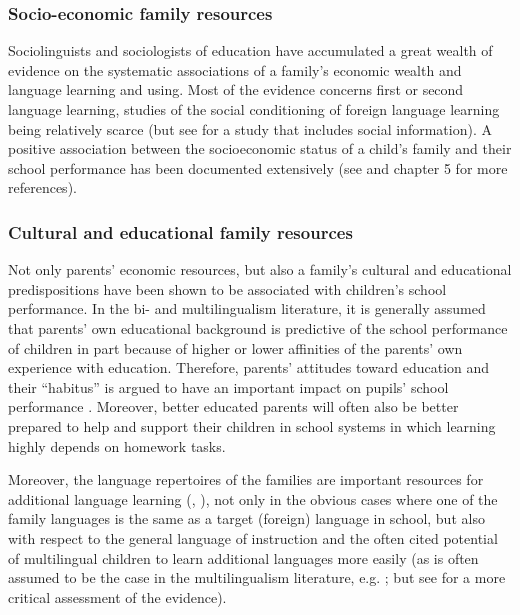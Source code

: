 \documentclass[output=paper]{langscibook}
\begin{document}
\subsubsection{Socio-economic family resources} %

Sociolinguists and sociologists of education have accumulated a great wealth of evidence on the systematic associations of a family’s economic wealth and language learning and using. Most of the evidence concerns first or second language learning, studies of the social conditioning of foreign language learning being relatively scarce (but see \citealt{KliemeDESIKonsortium2008} for a study that includes social information). A positive association between the socioeconomic status of a child’s family and their school performance has been documented extensively  (see \citealt{EntwisleAlexander1992} and chapter 5 for more references).

\subsubsection{Cultural and educational family resources}  %

Not only parents’ economic resources, but also a family’s cultural and educational predispositions have been shown to be associated with children’s school performance. In the bi- and multilingualism literature, it is generally assumed that parents' own educational background is predictive of the school performance of children in part because of higher or lower affinities of the parents' own experience with education. Therefore, parents’ attitudes toward education and their ``habitus'' is argued to have an important impact on pupils’ school performance \citep{Gogolin1994}. Moreover, better educated parents will often also be better prepared to help and support their children in school systems in which learning highly depends on homework tasks. 

Moreover, the language repertoires of the families are important resources for additional language learning (\citealt{SchepensEtAl2016}, \citealt{SchepensEtAl2020}), not only in the obvious cases where one of the family languages is the same as a target (foreign) language in school, but also with respect to the general language of instruction and the often cited potential of multilingual children to learn additional languages more easily (as is often assumed to be the case in the multilingualism literature, e.g. \citealt{MontanariQuay2019}; but see \citealt{BertheleUdry2019} for a more critical assessment of the evidence). 
\end{document}
